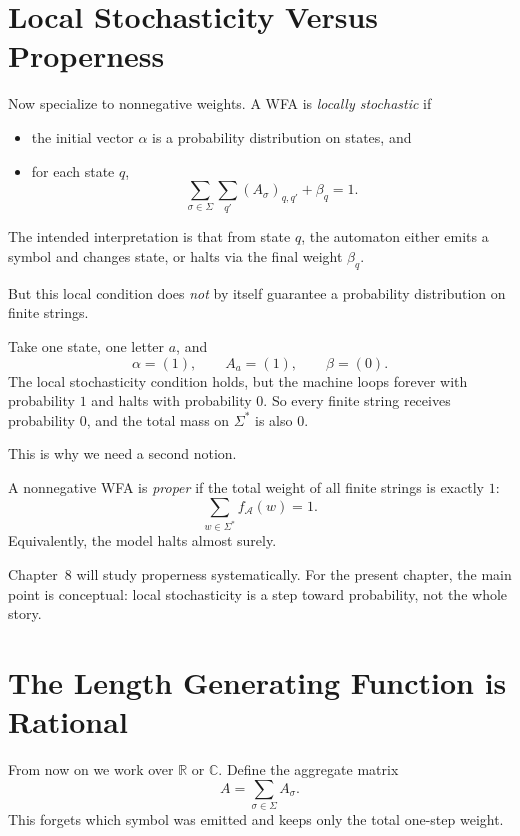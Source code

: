 \section{Local Stochasticity Versus Properness}

Now specialize to nonnegative weights. A WFA is \emph{locally stochastic} if
\begin{itemize}
  \item the initial vector $\alpha$ is a probability distribution on states, and
  \item for each state $q$,
  \[
    \sum_{\sigma \in \Sigma} \sum_{q'} (A_\sigma)_{q,q'} + \beta_q = 1.
  \]
\end{itemize}
The intended interpretation is that from state $q$, the automaton either emits a symbol and changes state, or halts via the final weight $\beta_q$.

But this local condition does \emph{not} by itself guarantee a probability distribution on finite strings.

\begin{example}
Take one state, one letter $a$, and
\[
  \alpha=(1), \qquad A_a=(1), \qquad \beta=(0).
\]
The local stochasticity condition holds, but the machine loops forever with probability $1$ and halts with probability $0$. So every finite string receives probability $0$, and the total mass on $\Sigma^*$ is also $0$.
\end{example}

This is why we need a second notion.

\begin{definition}
A nonnegative WFA is \emph{proper} if the total weight of all finite strings is exactly $1$:
\[
  \sum_{w \in \Sigma^*} f_{\mathcal A}(w) = 1.
\]
Equivalently, the model halts almost surely.
\end{definition}

Chapter~8 will study properness systematically. For the present chapter, the main point is conceptual: local stochasticity is a step toward probability, not the whole story.

\section{The Length Generating Function is Rational}

From now on we work over $\mathbb{R}$ or $\mathbb{C}$. Define the aggregate matrix
\[
  A = \sum_{\sigma \in \Sigma} A_\sigma.
\]
This forgets which symbol was emitted and keeps only the total one-step weight.

